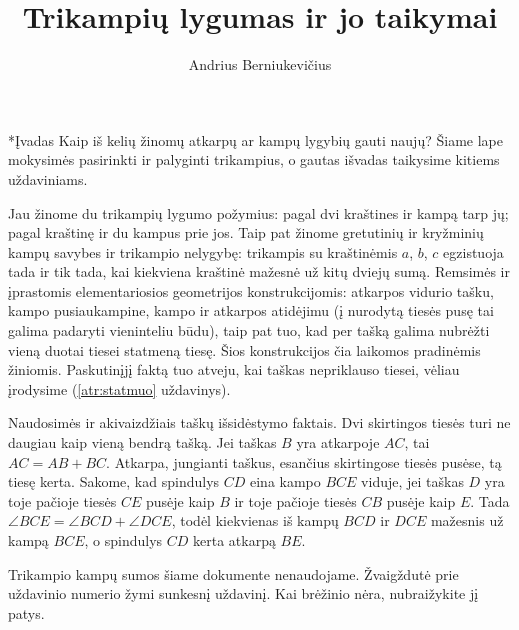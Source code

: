 \documentclass[12pt,a4paper,reqno]{amsart}
\title[Trikampių lygumas]{Trikampių lygumas ir jo taikymai}
\author{Andrius Berniukevičius}\newcommand{\mokykla}{Vilniaus licėjus}
\makeatletter
\def\section{\@startsection{section}{1}{\z@}{-1.5\baselineskip plus -.3\baselineskip minus -.2\baselineskip}{0.6\baselineskip}{\normalfont\large\bfseries\raggedright}}
\theoremstyle{plain}\newtheorem{theorem}{Teorema}[section]
\theoremstyle{definition}
\theoremstyle{remark}\newtheorem{remark}[theorem]{Pastaba}\newtheorem*{remark*}{Pastaba}
\theoremstyle{definition}\newtheorem*{problem*}{Uždavinys}
\makeatother
\begin{document}
\maketitle
\section*{Įvadas}
Kaip iš kelių žinomų atkarpų ar kampų lygybių gauti naujų? Šiame lape mokysimės pasirinkti ir palyginti trikampius, o gautas išvadas taikysime kitiems uždaviniams.

Jau žinome du trikampių lygumo požymius: pagal dvi kraštines ir kampą tarp jų; pagal kraštinę ir du kampus prie jos. Taip pat žinome gretutinių ir kryžminių kampų savybes ir trikampio nelygybę: trikampis su kraštinėmis $a$, $b$, $c$ egzistuoja tada ir tik tada, kai kiekviena kraštinė mažesnė už kitų dviejų sumą. Remsimės ir įprastomis elementariosios geometrijos konstrukcijomis: atkarpos vidurio tašku, kampo pusiaukampine, kampo ir atkarpos atidėjimu (į nurodytą tiesės pusę tai galima padaryti vieninteliu būdu), taip pat tuo, kad per tašką galima nubrėžti vieną duotai tiesei statmeną tiesę. Šios konstrukcijos čia laikomos pradinėmis žiniomis. Paskutinįjį faktą tuo atveju, kai taškas nepriklauso tiesei, vėliau įrodysime (\ref{atr:statmuo} uždavinys).

Naudosimės ir akivaizdžiais taškų išsidėstymo faktais. Dvi skirtingos tiesės turi ne daugiau kaip vieną bendrą tašką. Jei taškas $B$ yra atkarpoje $AC$, tai $AC=AB+BC$. Atkarpa, jungianti taškus, esančius skirtingose tiesės pusėse, tą tiesę kerta. Sakome, kad spindulys $CD$ eina kampo $BCE$ viduje, jei taškas $D$ yra toje pačioje tiesės $CE$ pusėje kaip $B$ ir toje pačioje tiesės $CB$ pusėje kaip $E$. Tada $\angle BCE=\angle BCD+\angle DCE$, todėl kiekvienas iš kampų $BCD$ ir $DCE$ mažesnis už kampą $BCE$, o spindulys $CD$ kerta atkarpą $BE$.

Trikampio kampų sumos šiame dokumente nenaudojame. Žvaigždutė prie uždavinio numerio žymi sunkesnį uždavinį. Kai brėžinio nėra, nubraižykite jį patys.
\end{document}
